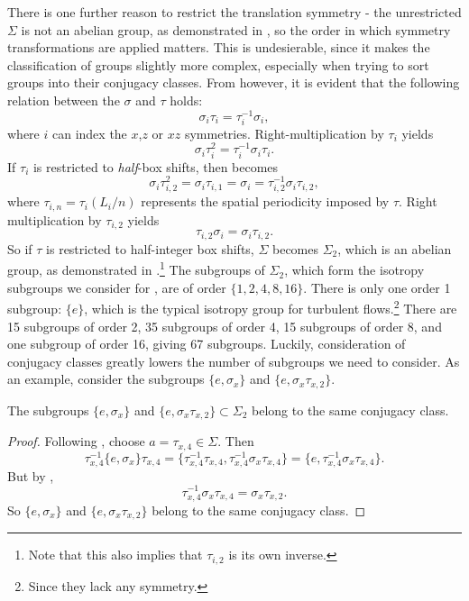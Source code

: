 There is one further reason to restrict the translation symmetry - the unrestricted $\Sigma$ is not an abelian group, as demonstrated in , so the order in which symmetry transformations are applied matters. This is undesierable, since it makes the classification of groups slightly more complex, especially when trying to sort groups into their conjugacy classes. From  however, it is evident that the following relation between the $\sigma$ and $\tau$ holds:
\begin{equation}
\sigma_{i}\tau_{i} = \tau_i^{-1}\sigma_i,
\end{equation}
where $i$ can index the $x$,$z$ or $xz$ symmetries. Right-multiplication by $\tau_i$ yields
\begin{equation}\label{eq:pscom}
\sigma_i\tau_i^2 = \tau_i^{-1}\sigma_i\tau_i.
\end{equation}
If $\tau_i$ is restricted to \emph{half}-box shifts, then  becomes
\begin{equation}
\sigma_i\tau_{i,2}^2 = \sigma_i\tau_{i,1} = \sigma_i = \tau_{i,2}^{-1}\sigma_{i}\tau_{i,2},
\end{equation}
where $\tau_{i,n} = \tau_i(L_i/n)$ represents the spatial periodicity imposed by $\tau$. Right multiplication by $\tau_{i,2}$ yields
\begin{equation}
\tau_{i,2}\sigma_{i} = \sigma_{i}\tau_{i,2}.
\end{equation}
So if $\tau$ is restricted to half-integer box shifts, $\Sigma$ becomes $\Sigma_2$, which is an abelian group, as demonstrated in .\footnote{Note that this also implies that $\tau_{i,2}$ is its own inverse.} The subgroups of $\Sigma_2$, which form the isotropy subgroups we consider for \pCf, are of order $\{1,2,4,8,16\}$. There is only one order 1 subgroup: $\{ e \}$, which is the typical isotropy group for turbulent flows.\footnote{Since they lack any symmetry.} There are 15 subgroups of order 2, 35 subgroups of order 4, 15 subgroups of order 8, and one subgroup of order 16, giving 67 subgroups. Luckily, consideration of conjugacy classes greatly lowers the number of subgroups we need to consider. As an example, consider the subgroups $\{ e, \sigma_x\}$ and $\{e, \sigma_x\tau_{x,2}\}$.
\clearpage
\begin{theorem}
The subgroups $\{ e, \sigma_x\}$ and $\{e, \sigma_x\tau_{x,2}\} \subset \Sigma_2$ belong to the same conjugacy class.
\end{theorem}
\begin{proof}
Following , choose $a = \tau_{x,4} \in \Sigma$. Then
\begin{equation}
\tau_{x,4}^{-1}\{ e, \sigma_x\}\tau_{x,4} = \{ \tau_{x,4}^{-1}\tau_{x,4},\tau_{x,4}^{-1}\sigma_x\tau_{x,4}\} =\{e,\tau_{x,4}^{-1}\sigma_x\tau_{x,4}\} .
\end{equation}
But by ,
\begin{equation}
\tau_{x,4}^{-1}\sigma_x\tau_{x,4} = \sigma_x\tau_{x,2}.
\end{equation}
So $\{ e, \sigma_x\}$ and $\{e, \sigma_x\tau_{x,2}\}$ belong to the same conjugacy class.
\end{proof}

